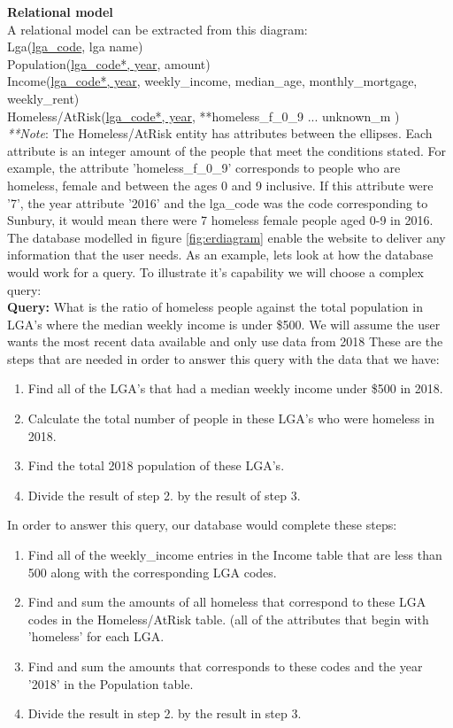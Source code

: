 \documentclass[12pt, a4paper]{article}
\begin{document}
\textbf{Relational model}\\
A relational model can be extracted from this diagram:\\
Lga(\underline{lga\_code}, lga name)\\
Population(\underline{lga\_code*, year}, amount)\\
Income(\underline{lga\_code*, year}, weekly\_income, median\_age, monthly\_mortgage, weekly\_rent)\\
Homeless/AtRisk(\underline{lga\_code*, year}, **homeless\_f\_0\_9 ... unknown\_m )\\

\emph{**Note}: The Homeless/AtRisk entity has attributes between the ellipses. Each attribute is an integer amount of the people that meet the conditions stated. For example, the attribute 'homeless\_f\_0\_9' corresponds to people who are homeless, female and between the ages 0 and 9 inclusive. If this attribute were '7', the year attribute '2016' and the lga\_code was the code corresponding to Sunbury, it would mean there were 7 homeless female people aged 0-9 in 2016.\\

The database modelled in figure \ref{fig:erdiagram} enable the website to deliver any information that the user needs. As an example, lets look at how the database would work for a query. To illustrate it's capability we will choose a complex query:\\

\textbf{Query:} What is the ratio of homeless people against the total population in LGA's where the median weekly income is under \$500. We will assume the user wants the most recent data available and only use data from 2018
These are the steps that are needed in order to answer this query with the data that we have:
\begin{enumerate}
\item Find all of the LGA's that had a median weekly income under \$500 in 2018.
\item Calculate the total number of people in these LGA's who were homeless in 2018.
\item Find the total 2018 population of these LGA's.
\item Divide the result of step 2. by the result of step 3.
\end{enumerate}
In order to answer this query, our database would complete these steps:
\begin{enumerate}
\item Find all of the weekly\_income entries in the Income table that are less than 500 along with the corresponding LGA codes.
\item Find and sum the amounts of all homeless that correspond to these LGA codes in the Homeless/AtRisk table. (all of the attributes that begin with 'homeless' for each LGA.
\item Find and sum the amounts that corresponds to these codes and the year '2018' in the Population table.
\item Divide the result in step 2. by the result in step 3.
\end{enumerate} 
\end{document}
